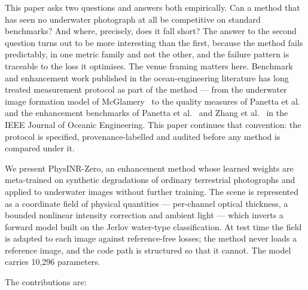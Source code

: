 \documentclass[journal]{IEEEtran}
\begin{document}
This paper asks two questions and answers both empirically. Can a method that has seen no underwater photograph at all be competitive on standard benchmarks? And where, precisely, does it fall short? The answer to the second question turns out to be more interesting than the first, because the method fails predictably, in one metric family and not the other, and the failure pattern is traceable to the loss it optimises. The venue framing matters here. Benchmark and enhancement work published in the ocean-engineering literature has long treated measurement protocol as part of the method --- from the underwater image formation model of McGlamery~\cite{mcglamery1980} to the quality measures of Panetta et al.~\cite{panetta2016uiqm} and the enhancement benchmarks of Panetta et al.~\cite{panetta2022uwtbench} and Zhang et al.~\cite{zhang2022attenuated} in the IEEE Journal of Oceanic Engineering. This paper continues that convention: the protocol is specified, provenance-labelled and audited before any method is compared under it.

We present PhysINR-Zero, an enhancement method whose learned weights are meta-trained on synthetic degradations of ordinary terrestrial photographs and applied to underwater images without further training. The scene is represented as a coordinate field of physical quantities --- per-channel optical thickness, a bounded nonlinear intensity correction and ambient light --- which inverts a forward model built on the Jerlov water-type classification. At test time the field is adapted to each image against reference-free losses; the method never loads a reference image, and the code path is structured so that it cannot. The model carries 10,296 parameters.

The contributions are:
\end{document}

